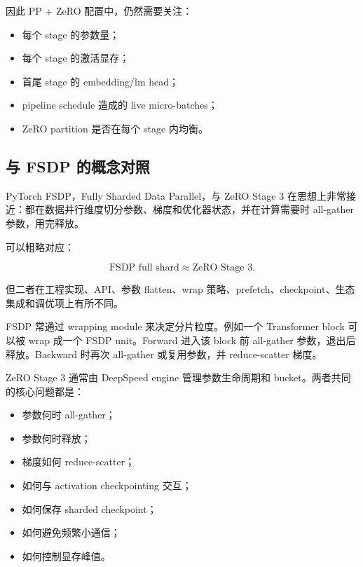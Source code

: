 因此 PP + ZeRO 配置中，仍然需要关注：

\begin{itemize}
\item 每个 stage 的参数量；
\item 每个 stage 的激活显存；
\item 首尾 stage 的 embedding/lm head；
\item pipeline schedule 造成的 live micro-batches；
\item ZeRO partition 是否在每个 stage 内均衡。
\end{itemize}

\subsection{与 FSDP 的概念对照}
\label{subsec:zero-vs-fsdp}

PyTorch FSDP，Fully Sharded Data Parallel，与 ZeRO Stage 3 在思想上非常接近：都在数据并行维度切分参数、梯度和优化器状态，并在计算需要时 all-gather 参数，用完释放。

可以粗略对应：

\[
\text{FSDP full shard}
\approx
\text{ZeRO Stage 3}.
\]

但二者在工程实现、API、参数 flatten、wrap 策略、prefetch、checkpoint、生态集成和调优项上有所不同。

FSDP 常通过 wrapping module 来决定分片粒度。例如一个 Transformer block 可以被 wrap 成一个 FSDP unit。Forward 进入该 block 前 all-gather 参数，退出后释放。Backward 时再次 all-gather 或复用参数，并 reduce-scatter 梯度。

ZeRO Stage 3 通常由 DeepSpeed engine 管理参数生命周期和 bucket。两者共同的核心问题都是：

\begin{itemize}
\item 参数何时 all-gather；
\item 参数何时释放；
\item 梯度如何 reduce-scatter；
\item 如何与 activation checkpointing 交互；
\item 如何保存 sharded checkpoint；
\item 如何避免频繁小通信；
\item 如何控制显存峰值。
\end{itemize}

